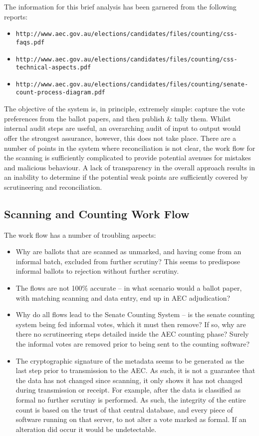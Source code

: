 \documentclass[10pt,a4paper]{article}
\begin{document}
The information for this brief analysis has been garnered from the following reports:
\begin{itemize}
\item {\tt	http://www.aec.gov.au/elections/candidates/files/counting/css-faqs.pdf}
\item {\tt	http://www.aec.gov.au/elections/candidates/files/counting/css-technical-aspects.pdf}
\item {\tt	http://www.aec.gov.au/elections/candidates/files/counting/senate-count-process-diagram.pdf}
\end{itemize}

The objective of the system is, in principle, extremely simple: capture the vote preferences from the ballot papers, and then publish \& tally them. Whilst internal audit steps are useful, an overarching audit of input to output would offer the strongest assurance, however, this does not take place. There are a number of points in the system where reconciliation is not clear, the work flow for the scanning is sufficiently complicated to provide potential avenues for mistakes and malicious behaviour. A lack of transparency in the overall approach results in an inability to determine if the potential weak points are sufficiently covered by scrutineering and reconciliation. 

\subsection{Scanning and Counting Work Flow}
The work flow has a number of troubling aspects:
\begin{itemize}
\item Why are ballots that are scanned as unmarked, and having come from an informal batch, excluded from further scrutiny? This seems to predispose informal ballots to rejection without further scrutiny.
\item The flows are not 100\% accurate – in what scenario would a ballot paper, with matching scanning and data entry, end up in AEC adjudication? 
\item Why do all flows lead to the Senate Counting System – is the senate counting system being fed informal votes, which it must then remove? If so, why are there no scrutineering steps detailed inside the AEC counting phase? Surely the informal votes are removed prior to being sent to the counting software?
\item The cryptographic signature of the metadata seems to be generated as the last step prior to transmission to the AEC. As such, it is not a guarantee that the data has not changed since scanning, it only shows it has not changed during transmission or receipt. For example, after the data is classified as formal no further scrutiny is performed. As such, the integrity of the entire count is based on the trust of that central database, and every piece of software running on that server, to not alter a vote marked as formal. If an alteration did occur it would be undetectable. 
\end{itemize}
\end{document}
